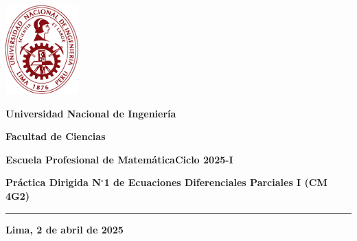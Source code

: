 



\noindent\parbox[c]{.18\textwidth}{\includegraphics[width=2.8cm]{logouni}}\hfill
\parbox[c]{1\textwidth}{\raggedright%
    {\large\textbf{Universidad Nacional de Ingeniería} \par\smallskip}
    {\large\textbf{Facultad de Ciencias} \par\smallskip}
    {\large\textbf{Escuela Profesional de Matemática}\hfil\qquad\qquad\qquad\textbf{Ciclo 2025-I}}
}

\begin{center}\bfseries\large
    Práctica Dirigida N$^{\circ}$1 de Ecuaciones Diferenciales
    Parciales I (CM 4G2)
\end{center}

\vspace{-0.5cm}

\hrulefill
\vspace{-2.5mm}

\rule{16.5cm}{0.8mm}

\begin{questions}
    
\end{questions}

\vfill
\begin{flushright}\bfseries
    Lima, 2 de abril de 2025
\end{flushright}

\clearpage

\appendix



